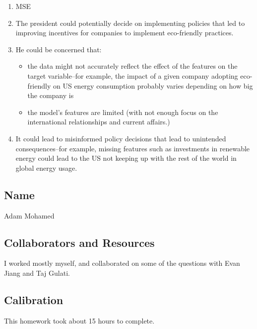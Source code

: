 \documentclass[submit]{harvardml}
\begin{document}
\begin{enumerate}
\item
    MSE

\item
    The president could potentially decide on implementing policies that led to improving incentives for companies to implement eco-friendly practices.

\item
    He could be concerned that:
    \begin{itemize}
        \item
        the data might not accurately reflect the effect of the features on the target variable–for example, the impact of a given company adopting eco-friendly on US energy consumption probably varies depending on how big the company is
        
        \item 
        the model's features are limited (with not enough focus on the international relationships and current affairs.)
    \end{itemize}

\item
    It could lead to misinformed policy decisions that lead to unintended consequences–for example, missing features such as investments in renewable energy could lead to the US not keeping up with the rest of the world in global energy usage.
\end{enumerate}


\newpage
\subsection*{Name}
Adam Mohamed

\subsection*{Collaborators and Resources}
I worked mostly myself, and collaborated on some of the questions with Evan Jiang and Taj Gulati.

\subsection*{Calibration}
This homework took about 15 hours to complete.
\end{document}
